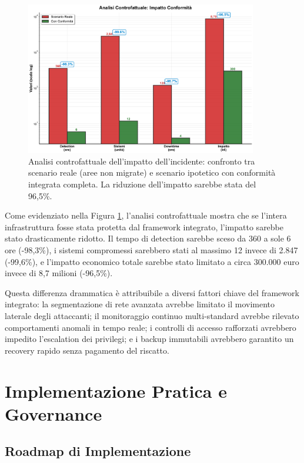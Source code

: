 \begin{figure}[h]
\centering
\includegraphics[width=0.9\textwidth]{thesis_figures/cap4/figura_4_5_confronto_LARGE.pdf}
\caption{Analisi controfattuale dell'impatto dell'incidente: confronto tra scenario reale (aree non migrate) e scenario ipotetico con conformità integrata completa. La riduzione dell'impatto sarebbe stata del 96,5\%.}
\label{fig:controfattuale}
\end{figure}

Come evidenziato nella Figura \ref{fig:controfattuale}, l'analisi controfattuale mostra che se l'intera infrastruttura fosse stata protetta dal framework integrato, l'impatto sarebbe stato drasticamente ridotto. Il tempo di detection sarebbe sceso da 360 a sole 6 ore (-98,3\%), i sistemi compromessi sarebbero stati al massimo 12 invece di 2.847 (-99,6\%), e l'impatto economico totale sarebbe stato limitato a circa 300.000 euro invece di 8,7 milioni (-96,5\%).

Questa differenza drammatica è attribuibile a diversi fattori chiave del framework integrato: la segmentazione di rete avanzata avrebbe limitato il movimento laterale degli attaccanti; il monitoraggio continuo multi-standard avrebbe rilevato comportamenti anomali in tempo reale; i controlli di accesso rafforzati avrebbero impedito l'escalation dei privilegi; e i backup immutabili avrebbero garantito un recovery rapido senza pagamento del riscatto.

\section{Implementazione Pratica e Governance}
\label{sec:4.5_implementazione}

\subsection{Roadmap di Implementazione}
\label{subsec:4.5.1_roadmap}

